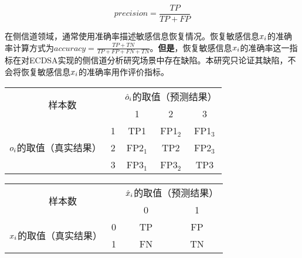 {	\begin{equation}\label{eq:precision}
		precision=\frac{TP}{TP+FP}
	\end{equation}

	在侧信道领域，通常使用准确率描述敏感信息恢复情况。恢复敏感信息$x_i$的准确率计算方式为$accuracy=\frac{TP+TN}{TP+FP+FN+TN}$。\textbf{但是}，恢复敏感信息$x_i$的准确率这一指标在对ECDSA实现的侧信道分析研究场景中存在缺陷。本研究只论证其缺陷，不会将恢复敏感信息$x_i$的准确率用作评价指标。

	\begin{table}[!h]
		\label{tab:cmatrixt}
		\centering
		\begin{tabular}{cc|ccc}
			\hline
			\multicolumn{2}{c|}{\multirow{2}{*}{样本数}} & \multicolumn{3}{c}{$\hat{o}_i$的取值（预测结果）} \\
			\multicolumn{2}{c|}{}& 1 & 2 & 3 \\
			\hline
			\multirow{3}{*}{$o_i$的取值（真实结果）} & 1 & TP1 & FP1$_2$ & FP1$_3$ \\
			& 2 & FP2$_1$ & TP2 & FP2$_3$ \\
			& 3 & FP3$_1$ & FP3$_2$ & TP3 \\
			\hline
		\end{tabular}   
	\end{table}

	\begin{table}[!h]
		\label{tab:cmatrixk}
		\centering
		\begin{tabular}{cc|cc}
			\hline
			\multicolumn{2}{c|}{\multirow{2}{*}{样本数}} & \multicolumn{2}{c}{$\hat{x}_i$的取值（预测结果）} \\
			\multicolumn{2}{c|}{}& 0& 1 \\
			\hline
			\multirow{2}{*}{$x_i$的取值（真实结果）} & 0 & TP & FP \\
			& 1 & FN & TN \\
			\hline
		\end{tabular}   
	\end{table}

}
